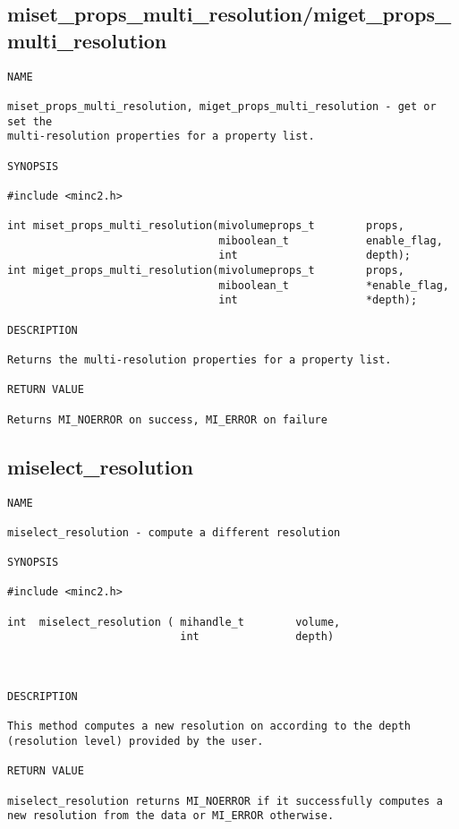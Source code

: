 \documentclass{article}
\begin{document}
\subsection{miset\_props\_multi\_resolution/miget\_props\_multi\_resolution}
\begin{verbatim}
NAME

miset_props_multi_resolution, miget_props_multi_resolution - get or set the
multi-resolution properties for a property list.

SYNOPSIS

#include <minc2.h>

int miset_props_multi_resolution(mivolumeprops_t        props, 
                                 miboolean_t            enable_flag,
                                 int                    depth);
int miget_props_multi_resolution(mivolumeprops_t        props, 
                                 miboolean_t            *enable_flag,
                                 int                    *depth);

DESCRIPTION

Returns the multi-resolution properties for a property list.

RETURN VALUE

Returns MI_NOERROR on success, MI_ERROR on failure
\end{verbatim}

\subsection{miselect\_resolution}
\begin{verbatim}
NAME 

miselect_resolution - compute a different resolution

SYNOPSIS

#include <minc2.h>

int  miselect_resolution ( mihandle_t        volume,
                           int               depth)
                                   
                       
                                
DESCRIPTION

This method computes a new resolution on according to the depth 
(resolution level) provided by the user. 

RETURN VALUE

miselect_resolution returns MI_NOERROR if it successfully computes a
new resolution from the data or MI_ERROR otherwise.
\end{verbatim}
\end{document}
